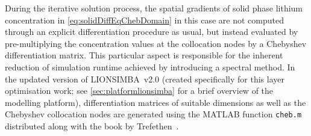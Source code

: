     During  the  iterative solution  process,  the  spatial gradients  of  solid
    phase  lithium  concentration  in  \cref{eq:solidDiffEqChebDomain}  in  this
    case  are  not  computed   through  an  explicit  differentiation  procedure
    as  usual,  but  instead  evaluated  by  pre-multiplying  the  concentration
    values  at the  collocation  nodes by  a  Chebyshev differentiation  matrix.
    This  particular  aspect  is  responsible  for  the  inherent  reduction  of
    simulation  runtime  achieved  by  introducing a  spectral  method.  In  the
    updated  version  of LIONSIMBA~v2.0  (created  specifically  for this  layer
    optimisation work; see \cref{sec:platformlionsimba}  for a brief overview of
    the  modelling platform),  differentiation matrices  of suitable  dimensions
    as  well  as  the  Chebyshev  collocation  nodes  are  generated  using  the
    MATLAB  function   \texttt{cheb.m}  distributed  along  with   the  book  by
    Trefethen~\cite{Trefethen2000}.


